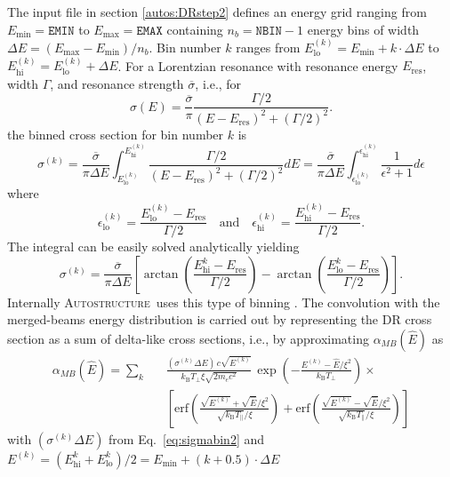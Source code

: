 \documentclass[a4paper,12pt]{article}
\newcommand{\autos}{\textsc{Autostructure}}
\begin{document}
The input file in section \ref{autos:DRstep2} defines an energy grid ranging from $E_\mathrm{min} = \texttt{EMIN}$ to $E_\mathrm{max} = \texttt{EMAX}$ containing $n_b = \texttt{NBIN}-1$ energy bins of width $\Delta E = (E_\mathrm{max}-E_\mathrm{min})/n_b$. Bin number $k$ ranges from $E^{(k)}_\mathrm{lo} = E_\mathrm{min}+k\cdot\Delta E$ to $E^{(k)}_\mathrm{hi} = E^{(k)}_\mathrm{lo}+\Delta E$. For a Lorentzian resonance with resonance energy $E_\mathrm{res}$, width $\Gamma$, and resonance strength $\overline{\sigma}$, i.e., for
\begin{equation}\label{eq:sigmaLor}
\sigma(E) = \frac{\overline{\sigma}} {\pi} \frac{\Gamma/2}{(E-E_\mathrm{res})^2+(\Gamma/2)^2}.
\end{equation}
the binned cross section for bin number $k$ is
\begin{equation}\label{eq:sigmabin1}
\sigma^{(k)} = \frac{\overline{\sigma}} {\pi\Delta E} \int_{E^{(k)}_\mathrm{lo}}^{E^{(k)}_\mathrm{hi}}\frac{\Gamma/2}{(E-E_\mathrm{res})^2+(\Gamma/2)^2}dE = \frac{\overline{\sigma}} {\pi\Delta E} \int_{\epsilon^{(k)}_\mathrm{lo}}^{\epsilon^{(k)}_\mathrm{hi}} \frac{1}{\epsilon^2+1}d\epsilon
\end{equation}
where
\[
\epsilon^{(k)}_\mathrm{lo} = \frac{E^{(k)}_\mathrm{lo}-E_\mathrm{res}}{\Gamma/2}\text{~~~and~~~}\epsilon^{(k)}_\mathrm{hi} = \frac{E^{(k)}_\mathrm{hi}-E_\mathrm{res}}{\Gamma/2}.
\]
The integral can be easily solved analytically yielding
\begin{equation}\label{eq:sigmabin2}
\sigma^{(k)} = \frac{\overline{\sigma}}{\pi\Delta E} \left[\arctan\left(\frac{E^{k}_\mathrm{hi}-E_\mathrm{res}}{\Gamma/2}\right) - \arctan\left(\frac{E^{k}_\mathrm{lo}-E_\mathrm{res}}{\Gamma/2}\right)\right].
\end{equation}
Internally \autos\ uses this type of binning \cite{Badnell2006b}.  The convolution with the merged-beams energy distribution  is carried out by representing the DR cross section as a sum of delta-like cross sections, i.e., by  approximating $\alpha_{MB}(\hat{E})$ as 
\begin{eqnarray}
\alpha_{MB}(\hat{E}) = \sum_k & & \!\!\!\!\!\!\!\frac{(\sigma^{(k)}\Delta E)\,c\sqrt{E^{(k)}}}{k_\mathrm{B}T_\perp\xi\sqrt{2m_ec^2}}\,\exp\left(-\frac{E^{(k)}-\hat{E}/\xi^2}{k_\mathrm{B}T_\perp}\right)\times\nonumber\\&&
  \left[\mathrm{erf}\left(\frac{\sqrt{E^{(k)}}+\sqrt{\hat{E}}/\xi^2}{\sqrt{k_\mathrm{B}T_\|}/\xi}\right)
             +\mathrm{erf}\left(\frac{\sqrt{E^{(k)}}-\sqrt{\hat{E}}/\xi^2}{\sqrt{k_\mathrm{B}T_\|}/\xi}\right) \right]
\end{eqnarray}
with $(\sigma^{(k)}\Delta E)$ from Eq.~\ref{eq:sigmabin2} and $E^{(k)} = (E^{k}_\mathrm{hi}+E^{k}_\mathrm{lo})/2 = E_\mathrm{min}+(k+0.5)\cdot\Delta E$
\end{document}
